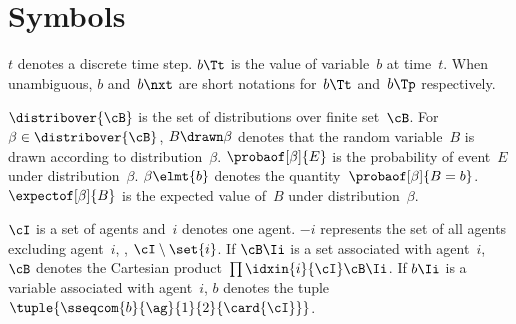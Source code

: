 \section*{Symbols}

\(t\) denotes a discrete time step.
\(b\Tt\) is the value of variable~\(b\) at time~\(t\).
When unambiguous, \(b\) and~\(b\nxt\) are short notations for~\(b\Tt\) and~\(b\Tp\) respectively.

\(\distribover{\cB}\) is the set of distributions over finite set~\(\cB\).
For~\(\beta \in \distribover{\cB}\), \(B \drawn \beta\) denotes that the random variable~\(B\) is drawn according to distribution~\(\beta\).
\(\probaof[\beta]{E}\) is the probability of event~\(E\) under distribution~\(\beta\).
\(\beta \elmt {b}\) denotes the quantity~\(\probaof[\beta]{B = b}\).
\(\expectof[\beta]{B}\) is the expected value of~\(B\) under distribution~\(\beta\).

\(\cI\) is a set of agents and~\(i\) denotes one agent.
\(-i\) represents the set of all agents excluding agent~\(i\), \ie, \(\cI \setminus \set{i}\).
If \(\cB\Ii\) is a set associated with agent~\(i\), \(\cB\) denotes the Cartesian product~\(\prod\idxin{i}{\cI} \cB\Ii\).
If \(b\Ii\) is a variable associated with agent~\(i\), \(b\) denotes the tuple~\(\tuple{\sseqcom{b}{\ag}{1}{2}{\card{\cI}}}\).

\printglossary[type=acronym,title=Acronyms\bigskip]
